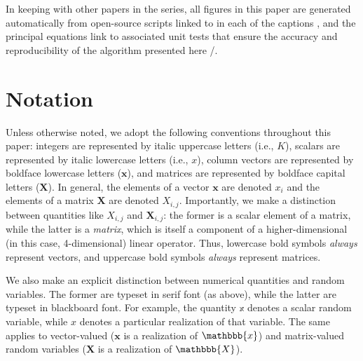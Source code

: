 \documentclass[modern]{aastex62}
\begin{document}
In keeping with other papers in the \starry series, all figures in this
paper are generated automatically from open-source scripts linked to in
each of the captions \codeicon, and the principal equations link to associated
unit tests that ensure the accuracy and reproducibility of the algorithm
presented here \testpassicon/\testfailicon.

%
%
%
%



%
%
%
%

\pagebreak
\appendix

%
%
%
%

\afterpage{
    
    \vfill
    \clearpage
}

%
%
%
%

\section{Notation}
\label{sec:notation}
%
Unless otherwise noted, we adopt
the following conventions throughout this paper:
integers are represented by italic uppercase letters (i.e., $K$),
scalars are represented by italic lowercase
letters (i.e., $x$), column vectors are
represented by boldface lowercase letters
($\mathbf{x}$), and matrices are represented
by boldface capital letters ($\mathbf{X}$). In general, the elements of a vector
$\mathbf{x}$ are denoted $x_i$ and the elements of a matrix $\mathbf{X}$
are denoted $X_{i,j}$. Importantly, we make a distinction between
quantities like $X_{i,j}$ and $\mathbf{X}_{i,j}$: the former is a scalar
element of a matrix, while the latter is a \emph{matrix}, which is itself
a component of a higher-dimensional (in this case, 4-dimensional) linear
operator. Thus, lowercase bold symbols \emph{always} represent vectors, and
uppercase bold symbols \emph{always} represent matrices.

We also make an explicit distinction
between numerical quantities and random variables. The former are typeset
in serif font (as above), while the latter are typeset in blackboard font.
For example, the quantity $\mathbb{x}$ denotes a scalar random variable,
while $x$ denotes a particular realization of that variable. The same
applies to vector-valued ($\mathbf{x}$ is a realization of $\mathbbb{x}$)
and matrix-valued random variables
($\mathbf{X}$ is a realization of $\mathbbb{X}$).
\end{document}
